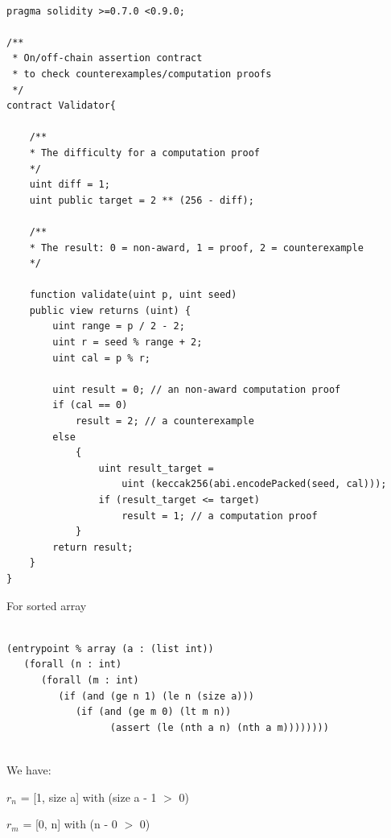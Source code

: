 \documentclass[runningheads]{llncs}
\begin{document}
\begin{lstlisting}[numbers=none]

pragma solidity >=0.7.0 <0.9.0;

/**
 * On/off-chain assertion contract 
 * to check counterexamples/computation proofs
 */
contract Validator{

    /**
    * The difficulty for a computation proof
    */
    uint diff = 1;
    uint public target = 2 ** (256 - diff); 

    /**
    * The result: 0 = non-award, 1 = proof, 2 = counterexample
    */

    function validate(uint p, uint seed) 
    public view returns (uint) {
        uint range = p / 2 - 2; 
        uint r = seed % range + 2;
        uint cal = p % r;

        uint result = 0; // an non-award computation proof 
        if (cal == 0)  
            result = 2; // a counterexample
        else 
            {
                uint result_target = 
                    uint (keccak256(abi.encodePacked(seed, cal)));
                if (result_target <= target) 
                    result = 1; // a computation proof    
            }
        return result;           
    }
}

\end{lstlisting}

For sorted array

\begin{lstlisting}[numbers=none]

(entrypoint % array (a : (list int))
   (forall (n : int)
      (forall (m : int)
         (if (and (ge n 1) (le n (size a)))
            (if (and (ge m 0) (lt m n))
                  (assert (le (nth a n) (nth a m))))))))
                  
\end{lstlisting}

\noindent We have:

$r_{n}$ = [1, size a] with (size a - 1 $>$ 0)

$r_{m}$ = [0, n] with (n - 0 $>$ 0)
\end{document}
